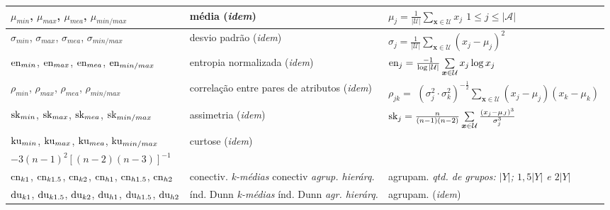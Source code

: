\begin{quadro}
\begin{threeparttable}
\begin{tabular}{|p{3.6cm}|p{4.6cm}|m{6cm}|}
${\mu}_{min}$, ${\mu}_{max}$, ${\mu}_{mea}$, ${\mu}_{min/max}$ &
média\tnote{c}\phantom{c} (\textit{idem}) & 
$\mu_j = \frac{1}{|\mathcal{U}|} \sum\limits_{\bm{x} \in \mathcal{U}} x_j$
$1 \leq j \leq |\mathcal{A}|$ \\ \hline

$\sigma_{min}$, $\sigma_{max}$, $\sigma_{mea}$, $\sigma_{min/max}$ &
desvio padrão\tnote{b}\phantom{b} (\textit{idem}) & 
$\sigma_j = \frac{1}{|\mathcal{U}|} \sum\limits_{\bm{x} \in \mathcal{U}}(x_j - \mu_j)^2$
\\ \hline

$\operatorname*{en}_{min}$, $\operatorname*{en}_{max}$, $\operatorname*{en}_{mea}$, $\operatorname*{en}_{min/max}$ &
entropia normalizada\tnote{b}\phantom{b} (\textit{idem}) & 
$\operatorname*{en}_j = \frac{-1}{\log|\mathcal{U}|} \sum\limits_{\bm{x} \in \mathcal{U}} x_j\log x_j$
\\ \hline

$\rho_{min}$, $\rho_{max}$, $\rho_{mea}$, $\rho_{min/max}$ &
correlação entre pares de atributos\tnote{b}\phantom{b} (\textit{idem}) & 
$\rho_{jk} = $ \phantom{ooooooooooo} \phantom{oooooooo}
$(\sigma_j^2\cdot\sigma_k^2)^{-\frac{1}{2}}
\sum\limits_{\bm{x} \in \mathcal{U}} 
(x_j - \mu_j)(x_k - \mu_k)$ \\ \hline

$\operatorname*{sk}_{min}$, $\operatorname*{sk}_{max}$, $\operatorname*{sk}_{mea}$, $\operatorname*{sk}_{min/max}$ &
assimetria\tnote{b}\phantom{b} (\textit{idem}) & 
$ \operatorname*{sk}_j = \frac{n}{(n -1)(n - 2)} \sum\limits_{\bm{x} \in \mathcal{U}}
\frac{(x_j - \mu_J)^3}{\sigma_j^3}$
\\ \hline

$\operatorname*{ku}_{min}$, $\operatorname*{ku}_{max}$, $\operatorname*{ku}_{mea}$, $\operatorname*{ku}_{min/max}$ &
curtose\tnote{b}\phantom{b} (\textit{idem}) & 
\makecell{$\ku_j =  \frac{n(n+1)}{(n -1)(n - 2)(n-3)}
\sum\limits_{\bm{x} \in \mathcal{U}}
\frac{(x_i - \mu_j)^4}{\sigma_j^4}$\\
$- 3(n-1)^2[(n-2)(n-3)]^{-1}$} \\ \hline

$\operatorname*{cn}_{k1}$, \phantom{ll}$\operatorname*{cn}_{k1.5}$, \phantom{ll}$\operatorname*{cn}_{k2}$,
$\operatorname*{cn}_{h1}$, \phantom{ll}$\operatorname*{cn}_{h1.5}$, \phantom{ll}$\operatorname*{cn}_{h2}$ &
conectiv.\tnote{e}\phantom{e} \textit{k-médias} \phantom{oooo}
conectiv \textit{agrup. hierárq.} & 
agrupam. \cite{xu2008clustering}
\textit{qtd. de grupos: $|Y|$; $1,5|Y|$ e $2|Y|$}\\
\hline

$\operatorname*{du}_{k1}$, \phantom{l}$\operatorname*{du}_{k1.5}$, \phantom{l}$\operatorname*{du}_{k2}$,
$\operatorname*{du}_{h1}$, \phantom{l}$\operatorname*{du}_{h1.5}$, \phantom{l}$\operatorname*{du}_{h2}$ &
índ. Dunn\tnote{e}\phantom{e} \textit{k-médias} \phantom{ooo}
índ. Dunn \textit{agr. hierárq.} &
agrupam. \cite{dunn1973fuzzy} \phantom{oooooo} (\textit{idem}) \\ \hline



\end{tabular}
\end{threeparttable}
\end{quadro}
